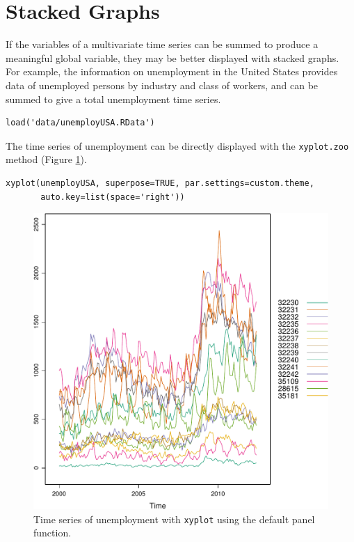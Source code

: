 \documentclass[smallroyalvopaper]{memoir}
\begin{document}
\section{Stacked Graphs}
\label{sec-3}
If the variables of a multivariate time series can be summed to
produce a meaningful global variable, they may be better displayed
with stacked graphs. For example, the information on unemployment in
the United States provides data of unemployed persons by industry and
class of workers, and can be summed to give a total unemployment time
series.

\lstset{language=R,numbers=none}
\begin{lstlisting}
load('data/unemployUSA.RData')
\end{lstlisting}

The time series of unemployment can be directly displayed
with the \texttt{xyplot.zoo} method (Figure \ref{fig:unemployUSAxyplot}).

\lstset{language=R,numbers=none}
\begin{lstlisting}
xyplot(unemployUSA, superpose=TRUE, par.settings=custom.theme,
       auto.key=list(space='right'))
\end{lstlisting}

\begin{figure}[htb]
\centering
\includegraphics[width=.9\linewidth]{figs/unemployUSAxyplot.pdf}
\caption{\label{fig:unemployUSAxyplot}Time series of unemployment  with \texttt{xyplot} using the default panel function.}
\end{figure}
\end{document}
